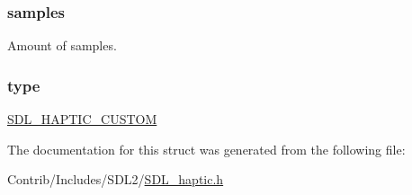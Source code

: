 \subsubsection[{\texorpdfstring{samples}{samples}}]{ samples}\hypertarget{struct_s_d_l___haptic_custom_afe09cc5fd2bca18a01641bc94ff31b2c}{}\label{struct_s_d_l___haptic_custom_afe09cc5fd2bca18a01641bc94ff31b2c}
Amount of samples. 
\subsubsection[{\texorpdfstring{type}{type}}]{ type}\hypertarget{struct_s_d_l___haptic_custom_a8db4a3e9f29940892f2773bca31c74e1}{}\label{struct_s_d_l___haptic_custom_a8db4a3e9f29940892f2773bca31c74e1}
\hyperlink{_s_d_l__haptic_8h_a8a18c4de1076ac9bebd718329d16db29}{S\+D\+L\+\_\+\+H\+A\+P\+T\+I\+C\+\_\+\+C\+U\+S\+T\+OM} 

The documentation for this struct was generated from the following file\+:\begin{DoxyCompactItemize}
\item 
Contrib/\+Includes/\+S\+D\+L2/\hyperlink{_s_d_l__haptic_8h}{S\+D\+L\+\_\+haptic.\+h}\end{DoxyCompactItemize}
